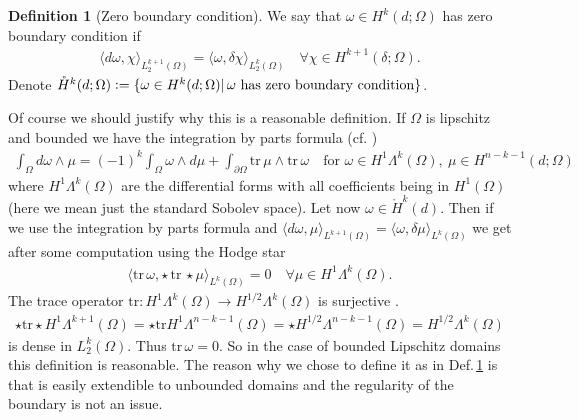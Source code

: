 \documentclass[12pt,a4paper]{article}
\numberwithin{equation}{subsection}
\numberwithin{lemma}{subsection}
\theoremstyle{definition}
\newtheorem{definition}[lemma]{Definition}
\begin{document}
\begin{definition}[Zero boundary condition] \label{def:zero_boundary_condition}
    We say that $\omega \in H^k(d;\Omega)$ has zero boundary condition if
    \begin{align*}
        \langle d\omega,\chi \rangle _{L^{k+1}_2(\Omega)}
        =  \langle \omega,\delta\chi \rangle _{L^k_2(\Omega)}
        \quad \forall \chi \in H^{k+1}(\delta;\Omega). 
    \end{align*}
    Denote $\mathring{H}^k(d;\Omega) \vcentcolon= \{ \omega \in H^k(d;\Omega)|\,
    \omega \text{ has zero boundary condition} \}$. 
\end{definition}
Of course we should justify why this is a reasonable definition. If $\Omega$ 
is lipschitz and bounded we have the integration by parts formula 
(cf. \cite[Thm.~6.3]{arnold})
\begin{align*}
    \int_\Omega d\omega \wedge \mu 
    = (-1)^k \int_\Omega \omega \wedge d \mu  + \int_{\partial\Omega} 
    \text{tr}\,\mu \wedge \text{tr}\,\omega \quad \text{for } \omega \in 
    H^1\Lambda^k(\Omega),\ \mu \in H^{n-k-1}(d;\Omega)  
\end{align*} 
where $H^1\Lambda^k(\Omega)$ are the differential forms with all coefficients
being in $H^1(\Omega)$ (here we mean just the standard Sobolev space). 
Let now $\omega \in \mathring{H}^k(d)$. Then if we use
the integration by parts formula and 
$\langle d\omega,\mu \rangle_{L^{k+1}(\Omega)} = 
\langle \omega, \delta \mu \rangle_{L^k(\Omega)}$ we get 
after some computation using the Hodge star
\begin{align*}
    \langle \text{tr}\,\omega, 
        \star\,\text{tr}\,\star\mu \rangle_{L^k(\Omega)}
    = 0 \quad \forall \mu \in H^1\Lambda^k(\Omega).
\end{align*}
The trace operator $\text{tr}: H^1\Lambda^k(\Omega) 
\rightarrow H^{1/2}\Lambda^k(\Omega)$ is surjective \cite[Thm.~6.1]{arnold}.
\begin{align*}
    \star\text{tr}\star H^1\Lambda^{k+1}(\Omega) 
    = \star \text{tr} H^1\Lambda^{n-k-1}(\Omega)
    = \star H^{1/2}\Lambda^{n-k-1}(\Omega)
    = H^{1/2}\Lambda^k(\Omega)
\end{align*}
is dense in $L^k_2(\Omega)$. Thus $\text{tr}\,\omega = 0$. So in the case 
of bounded Lipschitz domains this definition is reasonable. The reason why we
chose to define it as in Def.\,\ref{def:zero_boundary_condition} is that 
is easily extendible to unbounded domains and the regularity of the boundary
is not an issue. 
\end{document}
